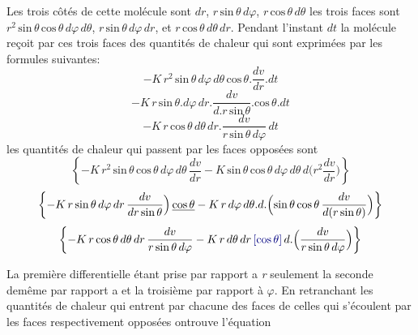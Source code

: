 \documentclass[11pt,a4paper]{article}
\begin{document}
Les trois côtés de cette molécule sont $dr$, $r\,\text{sin}\,\theta\,d\varphi$, $r\,\text{cos}\,\theta\,d\theta$
les trois faces sont $r^2\,\text{sin}\,\theta\,\text{cos}\,\theta\,d\varphi\,d\theta$, $r\,\text{sin}\,\theta\,d\varphi\,dr$, et $r\,\text{cos}\,\theta\,d\theta\,dr$.
Pendant l'instant $dt$ la molécule reçoit par ces trois faces des quantités
de chaleur qui sont exprimées par les formules suivantes:
\[ -K\,r^2\,\text{sin}\,\theta\,d\varphi\,d\theta\,\text{cos}\,\theta.\frac{dv}{dr}.dt \]
\[ -K\,r\,\text{sin}\,\theta.d\varphi\,dr.\frac{dv}{d.r\,\text{sin}\,\theta}.\text{cos}\,\theta.dt \]
\[ -K\,r\,\text{cos}\,\theta\,d\theta\,dr.\frac{dv}{r\,\text{sin}\,\theta\,d\varphi}\,dt \]
les quantités de chaleur qui passent par les faces opposées sont
\[ \left\{-K\,r^2\,\text{sin}\,\theta\,\text{cos}\,\theta\,d\varphi\,d\theta\,\frac{dv}{dr} - K\,\text{sin}\,\theta\,\text{cos}\,\theta\,d\varphi\,d\theta\,d\Big(r^2\frac{dv}{dr}\Big)\right\} \]
\[ \left\{-K\,r\,\text{sin}\,\theta\,d\varphi\,dr\,\frac{dv}{dr\,\text{sin}\,\theta}\Big)\,\struck{\text{cos}\,\theta} - K\,r\,d\varphi\,d\theta.d.\Big(\text{sin}\,\theta\,\text{cos}\,\theta\,\frac{dv}{d(r\,\text{sin}\,\theta)}\Big)\right\} \]
\[ \left\{-K\,r\,\text{cos}\,\theta\,d\theta\,dr\,\frac{dv}{r\,\text{sin}\,\theta\,d\varphi} - K\,r\,d\theta\,dr\,\add{\text{cos}\,\theta}\,d.\Big(\frac{dv}{r\,\text{sin}\,\theta\,d\varphi}\Big)\right\} \]

La première differentielle étant prise par rapport a \emph{r} seulement la
seconde demême par rapport a \ill{} et la troisième par rapport à $\varphi$.
En retranchant les quantités de chaleur qui entrent par chacune
des faces  de celles qui s'écoulent par les faces respectivement
opposées ontrouve l'équation
\end{document}
